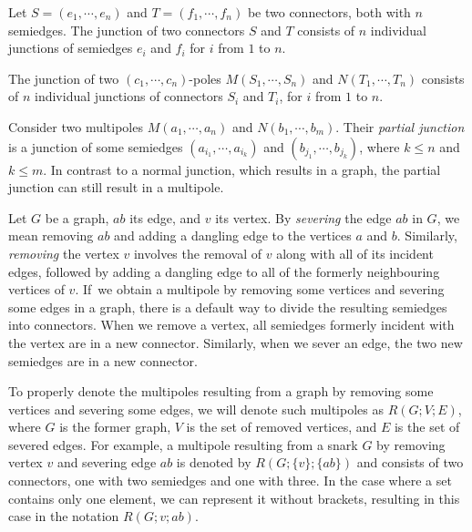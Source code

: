 Let $S=(e_1,\cdots,e_n)$ and $T=(f_1,\cdots,f_n)$ be two connectors, both with $n$ semiedges. The junction of two connectors $S$ and $T$ consists of $n$ individual junctions of semiedges $e_i$ and $f_i$ for $i$ from $1$ to $n$.

The junction of two $(c_1,\cdots,c_n)$-poles $M(S_1,\cdots,S_n)$ and $N(T_1,\cdots,T_n)$ consists of $n$ individual junctions of connectors $S_i$ and $T_i$, for $i$ from $1$ to $n$.

Consider two multipoles $M(a_1,\cdots,a_n)$ and $N(b_1,\cdots,b_m)$. Their \textit{partial junction} is a junction of some semiedges $(a_{i_1},\cdots, a_{i_k})$ and $(b_{j_1},\cdots, b_{j_k})$, where $k\leq n$ and $k\leq m$. In contrast to a normal junction, which results in a graph, the partial junction can still result in a multipole.

Let $G$ be a graph, $ab$ its edge, and $v$ its vertex. By \textit{severing} the edge $ab$ in $G$, we mean removing $ab$ and adding a dangling edge to the vertices $a$ and $b$. Similarly, \textit{removing} the vertex $v$ involves the removal of $v$ along with all of its incident edges, followed by adding a dangling edge to all of the formerly neighbouring vertices of $v$. If~we obtain a multipole by removing some vertices and severing some edges in a graph, there is a default way to divide the resulting semiedges into connectors. When we remove a vertex, all semiedges formerly incident with the vertex are in a new connector. Similarly, when we sever an edge, the two new semiedges are in a new connector.

To properly denote the multipoles resulting from a graph by removing some vertices and severing some edges, we will denote such multipoles as $R(G;V;E)$, where $G$ is the former graph, $V$ is the set of removed vertices, and $E$ is the set of severed edges. For example, a multipole resulting from a snark $G$ by removing vertex $v$ and severing edge $ab$ is denoted by $R(G;\{v\}; \{ab\})$ and consists of two connectors, one with two semiedges and one with three. In the case where a set contains only one element, we can represent it without brackets, resulting in this case in the notation $R(G;v; ab)$.